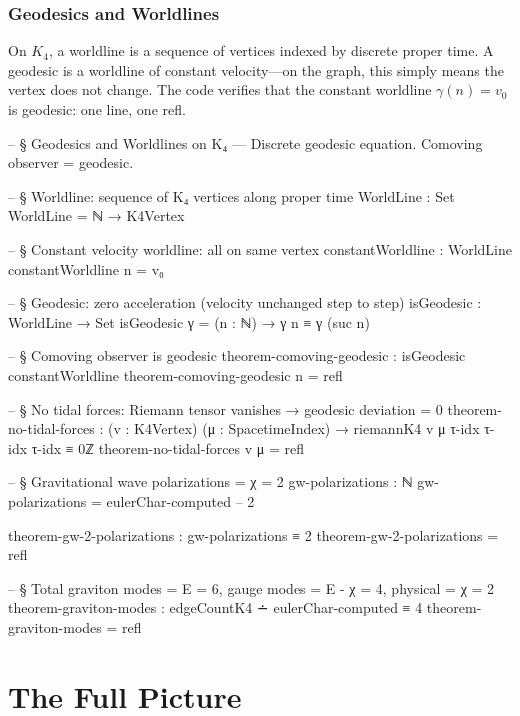\documentclass[11pt,a4paper]{book}
\def\texttt#1{#1}%
\begin{document}
\section{Geodesics and Worldlines}
\label{sec:geodesics-worldlines}

On $K_4$, a worldline is a sequence of vertices indexed by discrete proper time. A geodesic is a worldline of constant velocity---on the graph, this simply means the vertex does not change. The code verifies that the constant worldline $\gamma(n) = v_0$ is geodesic: one line, one \texttt{refl}.

\begin{code}
-- § Geodesics and Worldlines on K₄ — Discrete geodesic equation. Comoving observer = geodesic.

-- § Worldline: sequence of K₄ vertices along proper time
WorldLine : Set
WorldLine = ℕ → K4Vertex

-- § Constant velocity worldline: all on same vertex
constantWorldline : WorldLine
constantWorldline n = v₀

-- § Geodesic: zero acceleration (velocity unchanged step to step)
isGeodesic : WorldLine → Set
isGeodesic γ = (n : ℕ) → γ n ≡ γ (suc n)

-- § Comoving observer is geodesic
theorem-comoving-geodesic : isGeodesic constantWorldline
theorem-comoving-geodesic n = refl

-- § No tidal forces: Riemann tensor vanishes → geodesic deviation = 0
theorem-no-tidal-forces : (v : K4Vertex) (μ : SpacetimeIndex) →
  riemannK4 v μ τ-idx τ-idx τ-idx ≡ 0ℤ
theorem-no-tidal-forces v μ = refl

-- § Gravitational wave polarizations = χ = 2
gw-polarizations : ℕ
gw-polarizations = eulerChar-computed  -- 2

theorem-gw-2-polarizations : gw-polarizations ≡ 2
theorem-gw-2-polarizations = refl

-- § Total graviton modes = E = 6, gauge modes = E - χ = 4, physical = χ = 2
theorem-graviton-modes : edgeCountK4 ∸ eulerChar-computed ≡ 4
theorem-graviton-modes = refl
\end{code}

\part{The Full Picture}
\label{part:full-picture}
\end{document}

